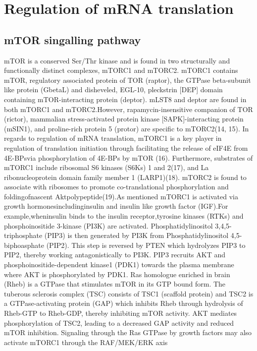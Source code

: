 \documentclass[12pt,openany]{book}
\begin{document}
\section{Regulation of mRNA translation}

\subsection{mTOR singalling pathway}

mTOR is a conserved Ser/Thr kinase and is found in two structurally and
functionally distinct complexes, mTORC1 and mTORC2. mTORC1 contains
mTOR, regulatory associated protein of TOR (raptor), the GTPase
beta-subunit like protein (GbetaL) and disheveled, EGL-10, pleckstrin
{[}DEP{]} domain containing mTOR-interacting protein (deptor). mLST8 and
deptor are found in both mTORC1 and mTORC2.However,
rapamycin-insensitive companion of TOR (rictor), mammalian
stress-activated protein kinase {[}SAPK{]}-interacting protein (mSIN1),
and proline-rich protein 5 (protor) are specific to mTORC2(14, 15). In
regards to regulation of mRNA translation, mTORC1 is a key player in
regulation of translation initiation through facilitating the release of
eIF4E from 4E-BPsvia phosphorylation of 4E-BPs by mTOR (16).
Furthermore, substrates of mTORC1 include ribosomal S6 kinases (S6Ks) 1
and 2(17), and La ribonucleoprotein domain family member 1 (LARP1)(18).
mTORC2 is found to associate with ribosomes to promote co-translational
phosphorylation and foldingofnascent Aktpolypeptide(19).As mentioned
mTORC1 is activated via growth hormonesincludinginsulin and insulin like
growth factor (IGF).For example,wheninsulin binds to the insulin
receptor,tyrosine kinases (RTKs) and phosphoinositide 3-kinase (PI3K)
are activated. Phosphatidylinositol 3,4,5-triphosphate (PIP3) is then
generated by PI3K from Phosphatidylinositol 4,5-biphoasphate (PIP2).
This step is reversed by PTEN which hydrolyzes PIP3 to PIP2, thereby
working antagonistically to PI3K. PIP3 recruits AKT and
phosphoinositide-dependent kinase1 (PDK1) towards the plasma membrane
where AKT is phosphorylated by PDK1. Ras homologue enriched in brain
(Rheb) is a GTPase that stimulates mTOR in its GTP bound form. The
tuberous sclerosis complex (TSC) consists of TSC1 (scaffold protein) and
TSC2 is a GTPase-activating protein (GAP) which inhibits Rheb through
hydrolysis of Rheb-GTP to Rheb-GDP, thereby inhibiting mTOR activity.
AKT mediates phosphorylation of TSC2, leading to a decreased GAP
activity and reduced mTOR inhibition. Signaling through the Ras GTPase
by growth factors may also activate mTORC1 through the RAF/MEK/ERK axis
\end{document}
